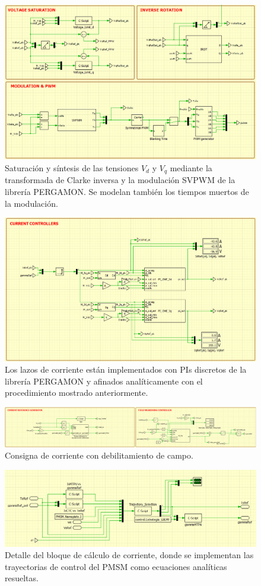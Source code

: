 \begin{figure}[H]
	\centering
	\includegraphics[width=0.7\linewidth]{fig/PLECS_voltage}
	\caption{Saturación y síntesis de las tensiones $V_d$ y $V_q$ mediante la transformada de Clarke inversa y la modulación SVPWM de la librería PERGAMON. Se modelan también los tiempos muertos de la modulación.}
	\label{fig:plecsvoltage}
\end{figure}
\begin{figure}[H]
	\centering
	\includegraphics[width=0.7\linewidth]{fig/PLECS_current-loop}
	\caption{Los lazos de corriente están implementados con PIs discretos de la librería PERGAMON y afinados analíticamente con el procedimiento mostrado anteriormente.}
\end{figure}
\begin{figure}[H]
	\centering
	\includegraphics[width=0.9\linewidth]{fig/PLECS_currentref}
	\caption{Consigna de corriente con debilitamiento de campo.}
\end{figure}
\begin{figure}[H]
	\centering
	\includegraphics[width=0.7\linewidth]{fig/PLECS_currentref1}
	\caption{Detalle del bloque de cálculo de corriente, donde se implementan las trayectorias de control del PMSM como ecuaciones analíticas resueltas.}
\end{figure}
